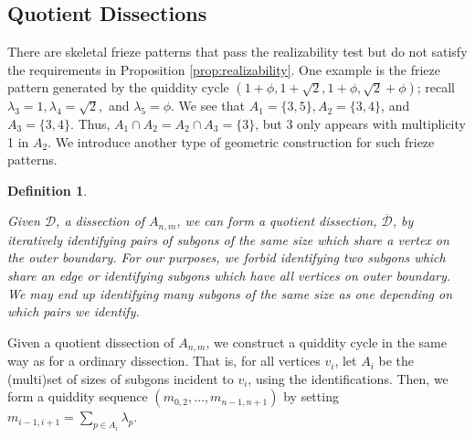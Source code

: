 \documentclass[12pt]{article}
\newtheorem{definition}{Definition}
\theoremstyle{remark}
\newcommand*{\D}{\mathcal{D}}
\begin{document}
\subsection{Quotient Dissections}\label{subsec:Dumpling}

There are skeletal frieze patterns that pass the realizability test but do not satisfy the requirements in Proposition \ref{prop:realizability}. One example is the frieze pattern generated by the quiddity cycle $(1+\phi,1+\sqrt{2},1+\phi,\sqrt{2} + \phi)$; recall $\lambda_3 = 1, \lambda_4 = \sqrt{2},$ and $\lambda_5 = \phi$. We see that $A_1 = \{3,5\}, A_2 = \{3,4\}$, and $A_3 = \{3,4\}$. Thus, $A_1 \cap A_2 = A_2 \cap A_3 = \{3\}$, but 3 only appears with multiplicity 1 in $A_2$. We introduce another type of geometric construction for such frieze patterns. 

\begin{definition}\label{def:QuotientDissection}

Given $\D$, a dissection of $A_{n,m}$, we can form a \emph{quotient dissection}, $\overline{\D}$, by iteratively identifying pairs of subgons of the same size which share a vertex on the outer boundary. For our purposes, we forbid identifying two subgons which share an edge or identifying subgons which have all vertices on outer boundary. We may end up identifying many subgons of the same size as one depending on which pairs we identify. 
\end{definition}

Given a quotient dissection of $A_{n,m}$, we construct a quiddity cycle in the same way as for a ordinary dissection. That is, for all vertices $v_i$, let $A_{i}$ be the (multi)set of sizes of subgons incident to $v_i$, using the identifications. Then, we form a quiddity sequence $(m_{0,2},\ldots, m_{n-1,n+1})$ by setting $m_{i-1,i+1} = \sum_{p \in A_i} \lambda_p$.
\end{document}

